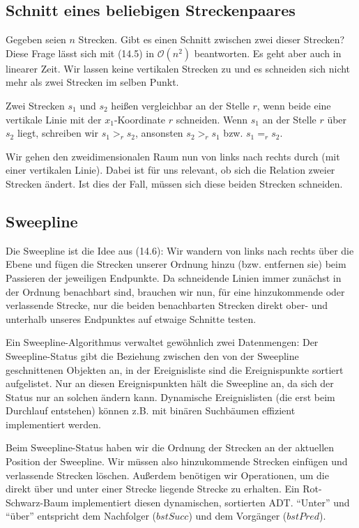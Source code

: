 \documentclass[12pt]{article}
\begin{document}
\subsection{Schnitt eines beliebigen Streckenpaares}

Gegeben seien $n$ Strecken. Gibt es einen Schnitt zwischen zwei dieser Strecken? Diese Frage lässt sich mit (14.5) in $\mathcal O(n^2)$ beantworten. Es geht aber auch in linearer Zeit. Wir lassen keine vertikalen Strecken zu und es schneiden sich nicht mehr als zwei Strecken im selben Punkt.

Zwei Strecken $s_1$ und $s_2$ heißen vergleichbar an der Stelle $r$, wenn beide eine vertikale Linie mit der $x_1$-Koordinate $r$ schneiden. Wenn $s_1$ an der Stelle $r$ über $s_2$ liegt, schreiben wir $s_1 >_r s_2$, ansonsten $s_2 >_r s_1$ bzw. $s_1 =_r s_2$.

Wir gehen den zweidimensionalen Raum nun von links nach rechts durch (mit einer vertikalen Linie). Dabei ist für uns relevant, ob sich die Relation zweier Strecken ändert. Ist dies der Fall, müssen sich diese beiden Strecken schneiden.

\subsection{Sweepline}

Die Sweepline ist die Idee aus (14.6): Wir wandern von links nach rechts über die Ebene und fügen die Strecken unserer Ordnung hinzu (bzw. entfernen sie) beim Passieren der jeweiligen Endpunkte. Da schneidende Linien immer zunächst in der Ordnung benachbart sind, brauchen wir nun, für eine hinzukommende oder verlassende Strecke, nur die beiden benachbarten Strecken direkt ober- und unterhalb unseres Endpunktes auf etwaige Schnitte testen.

Ein Sweepline-Algorithmus verwaltet gewöhnlich zwei Datenmengen: Der Sweepline-Status gibt die Beziehung zwischen den von der Sweepline geschnittenen Objekten an, in der Ereignisliste sind die Ereignispunkte sortiert aufgelistet. Nur an diesen Ereignispunkten hält die Sweepline an, da sich der Status nur an solchen ändern kann. Dynamische Ereignislisten (die erst beim Durchlauf entstehen) können z.B. mit binären Suchbäumen effizient implementiert werden.

Beim Sweepline-Status haben wir die Ordnung der Strecken an der aktuellen Position der Sweepline. Wir müssen also hinzukommende Strecken einfügen und verlassende Strecken löschen. Außerdem benötigen wir Operationen, um die direkt über und unter einer Strecke liegende Strecke zu erhalten. Ein Rot-Schwarz-Baum implementiert diesen dynamischen, sortierten ADT. \enquote{Unter} und \enquote{über} entspricht dem Nachfolger ($bstSucc$) und dem Vorgänger ($bstPred$).
\end{document}
